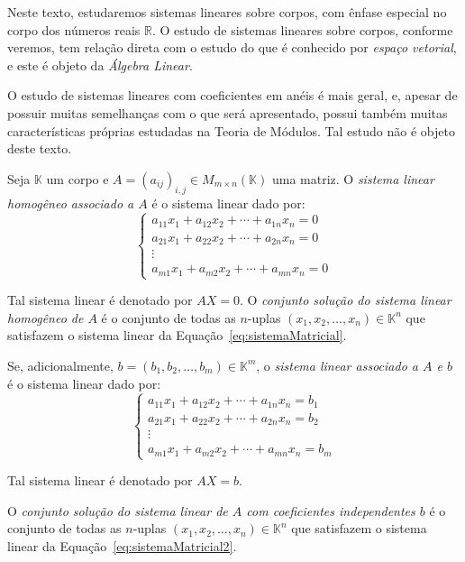 Neste texto, estudaremos sistemas lineares sobre corpos, com ênfase especial no corpo dos números reais $\mathbb R$.
O estudo de sistemas lineares sobre corpos, conforme veremos, tem relação direta com o estudo do que é conhecido por \emph{espaço vetorial}, e este é objeto da \emph{Álgebra Linear}.

O estudo de sistemas lineares com coeficientes em anéis é mais geral, e, apesar de possuir muitas semelhanças com o que será apresentado, possui também muitas características próprias estudadas na Teoria de Módulos.
Tal estudo não é objeto deste texto.

\begin{definition}
    Seja $\mathbb K$ um corpo e $A=(a_{ij})_{i, j}\in M_{m \times n}(\mathbb K)$ uma matriz.
    O \emph{sistema linear homogêneo associado a $A$} é o sistema linear dado por:
    \begin{equation}\label{eq:sistemaMatricial}
        \begin{cases}
            a_{11}x_1 + a_{12}x_2 + \cdots + a_{1n}x_n = 0 \\
            a_{21}x_1 + a_{22}x_2 + \cdots + a_{2n}x_n = 0 \\
            \vdots \\
            a_{m1}x_1 + a_{m2}x_2 + \cdots + a_{mn}x_n = 0
        \end{cases}
    \end{equation}

    Tal sistema linear é denotado por $AX=0$.
    O \emph{conjunto solução do sistema linear homogêneo de $A$} é o conjunto de todas as $n$-uplas $(x_1, x_2, \ldots, x_n)\in \mathbb K^n$ que satisfazem o sistema linear da Equação~\eqref{eq:sistemaMatricial}.

    Se, adicionalmente, $b=(b_1, b_2, \ldots, b_m)\in \mathbb K^m$, o \emph{sistema linear associado a $A$ e $b$} é o sistema linear dado por:
    \begin{equation}\label{eq:sistemaMatricial2}
        \begin{cases}
            a_{11}x_1 + a_{12}x_2 + \cdots + a_{1n}x_n = b_1 \\
            a_{21}x_1 + a_{22}x_2 + \cdots + a_{2n}x_n = b_2 \\
            \vdots \\
            a_{m1}x_1 + a_{m2}x_2 + \cdots + a_{mn}x_n = b_m
        \end{cases}
    \end{equation}

    Tal sistema linear é denotado por $AX=b$.

    O \emph{conjunto solução do sistema linear de $A$ com coeficientes independentes $b$} é o conjunto de todas as $n$-uplas $(x_1, x_2, \ldots, x_n)\in \mathbb K^n$ que satisfazem o sistema linear da Equação~\eqref{eq:sistemaMatricial2}.
\end{definition}

